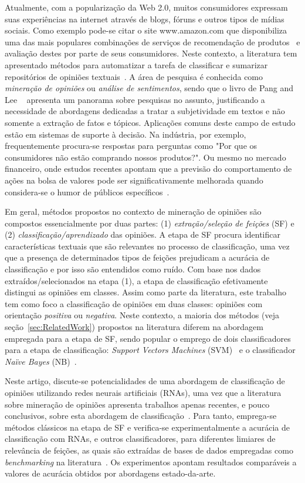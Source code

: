 \documentclass[11pt,a4paper]{article}
\begin{document}
Atualmente, com a popularização da Web 2.0, muitos consumidores expressam suas experiências na internet através de blogs, fóruns e outros tipos de mídias sociais. Como exemplo pode-se citar o site www.amazon.com que disponibiliza uma das mais populares combinações de serviços de recomendação de produtos~\cite{Linden:Amazon} e avaliação destes por parte de seus consumidores. Neste contexto, a literatura tem apresentado métodos para automatizar a tarefa de classificar e sumarizar repositórios de opiniões textuais~\cite{abbasi:FRN,Hatzivassiloglou:Predicting,Turney:Thumbs,Pang02:ThumbsUp,Pang08:Survey}. A área de pesquisa é conhecida como \textit{mineração de opiniões} ou \textit{análise de sentimentos}, sendo que o livro de Pang and Lee ~\cite{Pang08:Survey} apresenta um panorama sobre pesquisas no assunto, justificando a necessidade de abordagens dedicadas a tratar a subjetividade em textos e não somente a extração de fatos e tópicos. Aplicações comuns deste campo de estudo estão em sistemas de suporte à decisão. Na indústria, por exemplo, frequentemente procura-se respostas para perguntas como "Por que os consumidores não estão comprando nossos produtos?". Ou mesmo no mercado financeiro, onde estudos recentes apontam que a previsão do comportamento de ações na bolsa de valores pode ser significativamente melhorada quando considera-se o humor de públicos específicos~\cite{twitter:stock}.


Em geral, métodos propostos no contexto de mineração de opiniões são compostos essencialmente por duas partes: (1) \textit{extração/seleção de feições} (SF) e (2) \textit{classificação/aprendizado} das opiniões. A etapa de SF procura identificar características textuais que são relevantes no processo de classificação, uma vez que a presença de determinados tipos de feições prejudicam a acurácia de classificação e por isso são entendidos como ruído. Com base nos dados extraídos/selecionados na etapa (1), a etapa de classificação efetivamente distingui as opiniões em classes. Assim como parte da literatura, este trabalho tem como foco a classificação de opiniões em duas classes: opiniões com orientação \textit{positiva} ou \textit{negativa}. Neste contexto, a maioria dos métodos (veja seção~\ref{sec:RelatedWork}) propostos na literatura diferem na abordagem empregada para a etapa de SF, sendo popular o emprego de dois classificadores para a etapa de classificação: \textit{Support Vectors Machines} (SVM)~\cite{Hastie:learning} e o classificador \textit{Naïve Bayes} (NB)~\cite{Manning:IR}.

Neste artigo, discute-se potencialidades de uma abordagem de classificação de opiniões utilizando redes neurais artificiais (RNAs), uma vez que a literatura sobre mineração de opiniões apresenta trabalhos apenas recentes, e pouco conclusivos, sobre esta abordagem de classificação~\cite{Chen:blogosphere,zhu:ANN}. Para tanto, emprega-se métodos clássicos na etapa de SF e verifica-se experimentalmente a acurácia de classificação com RNAs, e outros classificadores, para diferentes limiares de relevância de feições, as quais são extraídas de bases de dados empregadas como \textit{benchmarking} na literatura~\cite{Pang04:Subjectivity}. Os experimentos apontam resultados comparáveis a valores de acurácia obtidos por abordagens estado-da-arte.
\end{document}
